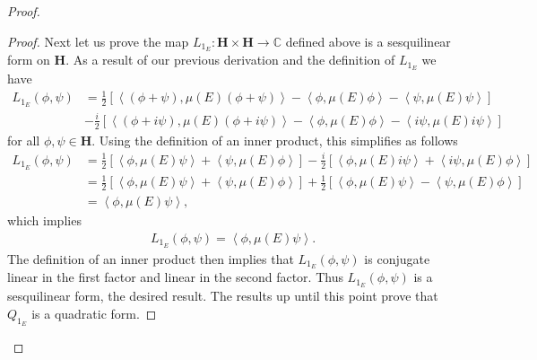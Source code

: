 \begin{proof}
\begin{proof}
Next let us prove the map $L_{1_E} : \mathbf{H} \times \mathbf{H} \rightarrow \mathbb{C}$ defined above is a sesquilinear form on $\mathbf{H}$. As a result of our previous derivation and the definition of $L_{1_E}$ we have
\begin{align}
    L_{1_E}(\phi, \psi) &= \frac{1}{2} \left[ \left< (\phi + \psi), \mu(E) (\phi + \psi) \right> - \left< \phi, \mu(E) \phi \right> - \left< \psi, \mu(E) \psi \right> \right] \\
                        &-\frac{i}{2} \left[ \left< (\phi + i\psi), \mu(E) (\phi + i\psi) \right> - \left< \phi, \mu(E) \phi \right> - \left< i\psi, \mu(E) i\psi \right> \right]
\end{align}
for all $\phi, \psi \in \mathbf{H}$. Using the definition of an inner product, this simplifies as follows
\begin{align}
    L_{1_E}(\phi, \psi) &= \frac{1}{2} \left[ \left< \phi, \mu(E) \psi \right> + \left< \psi, \mu(E) \phi \right> \right] - \frac{i}{2} \left[ \left< \phi, \mu(E) i\psi \right> + \left< i\psi, \mu(E) \phi \right> \right] \\
                        &= \frac{1}{2} \left[ \left< \phi, \mu(E) \psi \right> + \left< \psi, \mu(E) \phi \right> \right] + \frac{1}{2} \left[ \left< \phi, \mu(E) \psi \right> - \left< \psi, \mu(E) \phi \right> \right] \\
                        &= \left< \phi, \mu(E) \psi \right>,
\end{align}
which implies
\begin{align}
    L_{1_E}(\phi, \psi) = \left< \phi, \mu(E) \psi \right>.
\end{align}
The definition of an inner product then implies that $L_{1_E}(\phi, \psi)$ is conjugate linear in the first factor and linear in the second factor. Thus $L_{1_E}(\phi, \psi)$ is a sesquilinear form, the desired result. The results up until this point prove that $Q_{1_E}$ is a quadratic form.


\end{proof}
\end{proof}
